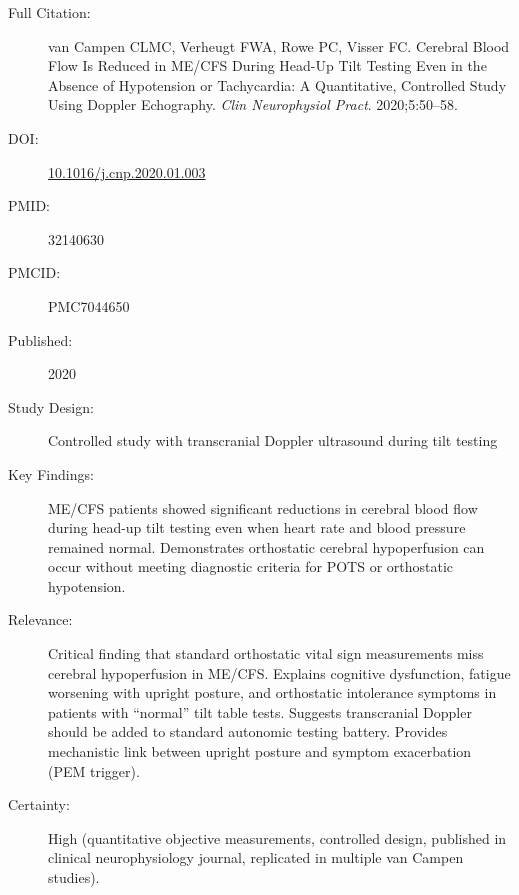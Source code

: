 \begin{description}
    \item[Full Citation:] van Campen CLMC, Verheugt FWA, Rowe PC, Visser FC. Cerebral Blood Flow Is Reduced in ME/CFS During Head-Up Tilt Testing Even in the Absence of Hypotension or Tachycardia: A Quantitative, Controlled Study Using Doppler Echography. \textit{Clin Neurophysiol Pract}. 2020;5:50--58.
    \item[DOI:] \href{https://doi.org/10.1016/j.cnp.2020.01.003}{10.1016/j.cnp.2020.01.003}
    \item[PMID:] 32140630
    \item[PMCID:] PMC7044650
    \item[Published:] 2020
    \item[Study Design:] Controlled study with transcranial Doppler ultrasound during tilt testing
    \item[Key Findings:] ME/CFS patients showed significant reductions in cerebral blood flow during head-up tilt testing even when heart rate and blood pressure remained normal. Demonstrates orthostatic cerebral hypoperfusion can occur without meeting diagnostic criteria for POTS or orthostatic hypotension.
    \item[Relevance:] Critical finding that standard orthostatic vital sign measurements miss cerebral hypoperfusion in ME/CFS. Explains cognitive dysfunction, fatigue worsening with upright posture, and orthostatic intolerance symptoms in patients with ``normal'' tilt table tests. Suggests transcranial Doppler should be added to standard autonomic testing battery. Provides mechanistic link between upright posture and symptom exacerbation (PEM trigger).
    \item[Certainty:] High (quantitative objective measurements, controlled design, published in clinical neurophysiology journal, replicated in multiple van Campen studies).
\end{description}

